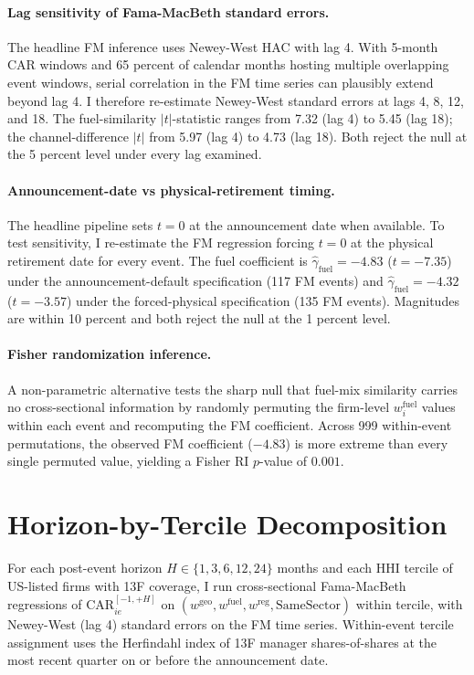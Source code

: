 \documentclass[12pt,a4paper]{article}
\begin{document}
\paragraph{Lag sensitivity of Fama-MacBeth standard errors.}
The headline FM inference uses Newey-West HAC with lag 4. With 5-month CAR windows and 65 percent of calendar months hosting multiple overlapping event windows, serial correlation in the FM time series can plausibly extend beyond lag 4. I therefore re-estimate Newey-West standard errors at lags 4, 8, 12, and 18. The fuel-similarity $|t|$-statistic ranges from 7.32 (lag 4) to 5.45 (lag 18); the channel-difference $|t|$ from 5.97 (lag 4) to 4.73 (lag 18). Both reject the null at the 5 percent level under every lag examined.

\paragraph{Announcement-date vs physical-retirement timing.}
The headline pipeline sets $t = 0$ at the announcement date when available. To test sensitivity, I re-estimate the FM regression forcing $t = 0$ at the physical retirement date for every event. The fuel coefficient is $\hat\gamma_{\mathrm{fuel}} = -4.83$ ($t = -7.35$) under the announcement-default specification (117 FM events) and $\hat\gamma_{\mathrm{fuel}} = -4.32$ ($t = -3.57$) under the forced-physical specification (135 FM events). Magnitudes are within 10 percent and both reject the null at the 1 percent level.

\paragraph{Fisher randomization inference.}
A non-parametric alternative tests the sharp null that fuel-mix similarity carries no cross-sectional information by randomly permuting the firm-level $w^{\mathrm{fuel}}_i$ values within each event and recomputing the FM coefficient. Across 999 within-event permutations, the observed FM coefficient ($-4.83$) is more extreme than every single permuted value, yielding a Fisher RI $p$-value of $0.001$.


\section{Horizon-by-Tercile Decomposition}\label{app:horizon_ownership}

For each post-event horizon $H \in \{1, 3, 6, 12, 24\}$ months and each HHI tercile of US-listed firms with 13F coverage, I run cross-sectional Fama-MacBeth regressions of $\mathrm{CAR}_{ie}^{[-1, +H]}$ on $(w^{\mathrm{geo}}, w^{\mathrm{fuel}}, w^{\mathrm{reg}}, \mathrm{SameSector})$ within tercile, with Newey-West (lag 4) standard errors on the FM time series. Within-event tercile assignment uses the Herfindahl index of 13F manager shares-of-shares at the most recent quarter on or before the announcement date.
\end{document}
